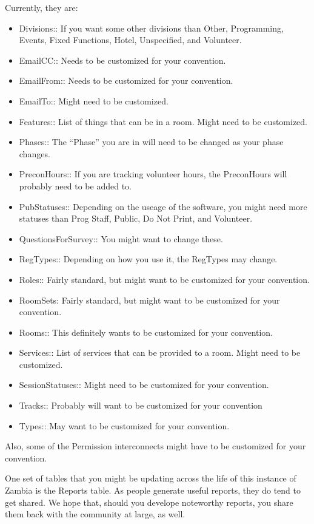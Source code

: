 \documentclass[tablesignature]{scrartcl}
\begin{document}
  Currently, they are:
\begin{itemize}
\item Divisions:: If you want some other divisions than Other,
    Programming, Events, Fixed Functions, Hotel, Unspecified, and
    Volunteer.
\item EmailCC:: Needs to be customized for your convention.
\item EmailFrom:: Needs to be customized for your convention.
\item EmailTo:: Might need to be customized.
\item Features:: List of things that can be in a room.  Might need to be
    customized.
\item Phases:: The ``Phase'' you are in will need to be changed as your
    phase changes.
\item PreconHours:: If you are tracking volunteer hours, the PreconHours
    will probably need to be added to.
\item PubStatuses:: Depending on the useage of the software, you might
    need more statuses than Prog Staff, Public, Do Not Print, and
    Volunteer.
\item QuestionsForSurvey:: You might want to change these.
\item RegTypes:: Depending on how you use it, the RegTypes may change.
\item Roles:: Fairly standard, but might want to be customized for your
    convention.
\item RoomSets: Fairly standard, but might want to be customized for
    your convention.
\item Rooms:: This definitely wants to be customized for your
    convention.
\item Services:: List of services that can be provided to a room.  Might
    need to be customized.
\item SessionStatuses:: Might need to be customized for your
    convention.
\item Tracks:: Probably will want to be customized for your convention
\item Types:: May want to be customized for your convention.
\end{itemize}

  Also, some of the Permission interconnects might have to be
  customized for your convention.

  One set of tables that you might be updating across the life of this
  instance of Zambia is the Reports table.  As people generate useful
  reports, they do tend to get shared.  We hope that, should you
  develope noteworthy reports, you share them back with the community
  at large, as well.
\end{document}
